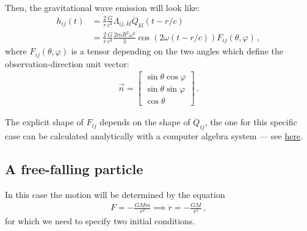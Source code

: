 \documentclass[main.tex]{subfiles}
\begin{document}
Then, the gravitational wave emission will look like: 
%
\begin{align}
h_{ij} (t) &= \frac{2}{r} \frac{G}{c^{4}} \Lambda_{ij, kl} \ddot{Q}_{kl} (t - r/ c)  \\
&= \frac{2}{r} \frac{G}{c^{4}} \frac{2 m R^2 \omega^2}{3} 
\cos(2 \omega (t - r/c)) F_{i j} (\theta , \varphi )
\,,
\end{align}
%
where \(F_{i j}(\theta , \varphi )\) is a tensor depending on the two angles which define the observation-direction unit vector:
%
\begin{align}
\vec{n} = \left[\begin{array}{c}
\sin \theta \cos \varphi  \\ 
\sin \theta \sin \varphi  \\ 
\cos \theta 
\end{array}\right]
\,.
\end{align}

The explicit shape of \(F_{i j}\) depends on the shape of \(\ddot{Q}_{i j}\), the one for this specific case can be calculated analytically with a computer algebra system --- see \href{https://jacopok.github.io/tt_gauge_gw.html}{here}.


%

\subsection{A free-falling particle}

In this case the motion will be determined by the equation 
%
\begin{align}
F = - \frac{GMm}{r^2} \implies \ddot{r} = - \frac{GM}{r^2}
\,,
\end{align}
%
for which we need to specify two initial conditions. 
\end{document}
